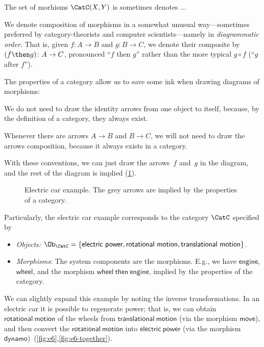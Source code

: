 \begin{remark}
The set of morhisms $\CatC(X, Y)$ is sometimes denotes ... 

\begin{remark}
We denote composition of morphisms in a somewhat unusual way---sometimes preferred by category-theorists and computer scientists---namely in \emph{diagrammatic order}. That is, given $f\colon A\to B$ and $g\colon B\to C$, we denote their composite by $(f\then g)\colon A\to C$, pronounced ``$f$ then $g$'' rather than the more typical $g\circ f$ (``$g$ after $f$'').
\end{remark}

\noindent The properties of a category allow us to save some ink when drawing diagrams of morphisms:
\begin{compactitem}
\item We do not need to draw the identity arrows from one object to itself, because, by the definition of a category, they always exist. 
\item  Whenever there are arrows $A\to B$ and $B \to C$, we will not need to draw the arrows composition, because it always exists in a category.
\end{compactitem}

With these conventions, we can just draw the arrows~$f$ and~$g$ in the diagram,
and the rest of the diagram is implied (\cref{fig:e5}).

\begin{figure}[h!]
    \centering
    \caption{\label{fig:e5} Electric car example. The grey arrows are implied by the properties
    of a category.}
\end{figure}

Particularly, the electric car example corresponds to the category $\CatC$ specified by 
\begin{itemize}
    \item \emph{Objects:} $\Ob_\CatC=\{\mathsf{electric}\ \mathsf{power},\mathsf{rotational}\ \mathsf{motion},\mathsf{translational}\ \mathsf{motion}\}$.
    \item \emph{Morphisms}: The system components are the morphisms. E.g., we have $\mathsf{engine}$, $\mathsf{wheel}$, and the morphism $\mathsf{wheel \ then \ engine}$, implied by the properties of the category.
\end{itemize}

We can slightly expand this example by noting the inverse transformations. In an electric car
it is possible to regenerate power; that is, we can obtain $\mathsf{rotational}\ \mathsf{motion}$ of the wheels from
$\mathsf{translational}\ \mathsf{motion}$ (via the morphism $\mathsf{move}$), and then convert the $\mathsf{rotational}\ \mathsf{motion}$ into $\mathsf{electric}\ \mathsf{power}$ (via the morphism $\mathsf{dynamo}$)~(\cref{fig:e6},\cref{fig:e6-together}).



\end{remark}
